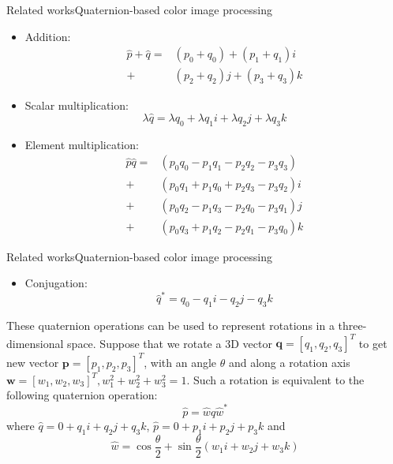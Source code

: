 \documentclass{beamer}
\begin{document}
\begin{frame}{Related works}{Quaternion-based color image processing}
    \begin{itemize}
        \item Addition:
        \begin{equation*}
            \begin{split}
                \hat{p}+\hat{q}=&(p_0+q_0)+(p_1+q_1)i\\
                                +&(p_2+q_2)j+(p_3+q_3)k
            \end{split}
        \end{equation*}
        \item Scalar multiplication: $$\lambda \hat{q}=\lambda q_0+\lambda q_1i+\lambda q_2j+\lambda q_3k$$
        \item Element multiplication: 
        \begin{equation*}
            \begin{split}
                \hat{p}\hat{q}=&(p_0q_0-p_1q_1-p_2q_2-p_3q_3)\\
                            +&(p_0q_1+p_1q_0+p_2q_3-p_3q_2)i\\
                            +&(p_0q_2-p_1q_3-p_2q_0-p_3q_1)j\\
                            +&(p_0q_3+p_1q_2-p_2q_1-p_3q_0)k
            \end{split}
        \end{equation*}
    \end{itemize}
\end{frame}

\begin{frame}{Related works}{Quaternion-based color image processing}
    \begin{itemize}
        \item Conjugation: $$\hat{q}^*=q_0-q_1i-q_2j-q_3k$$
    \end{itemize}
    These quaternion operations can be used to represent rotations in a three-dimensional space. Suppose that we rotate a 3D vector $\textbf{q}=[q_1,q_2,q_3]^T$ to get new vector $\textbf{p}=[p_1,p_2,p_3]^T$, with an angle $\theta$ and along a rotation axis $\textbf{w}=[w_1,w_2,w_3]^T, w_1^2+w_2^2+w_3^2=1$. Such a rotation is equivalent to the following
    quaternion operation:
    $$\hat{p}=\hat{w}\hat{q}\hat{w}^*$$
    where $\hat{q}= 0 + q_1i + q_2j + q_3k$, $\hat{p}= 0 + p_1i + p_2j + p_3k$ and 
    $$\hat{w}=\cos\frac{\theta}{2}+\sin\frac{\theta}{2}(w_1i + w_2j + w_3k)$$
\end{frame}
\end{document}
